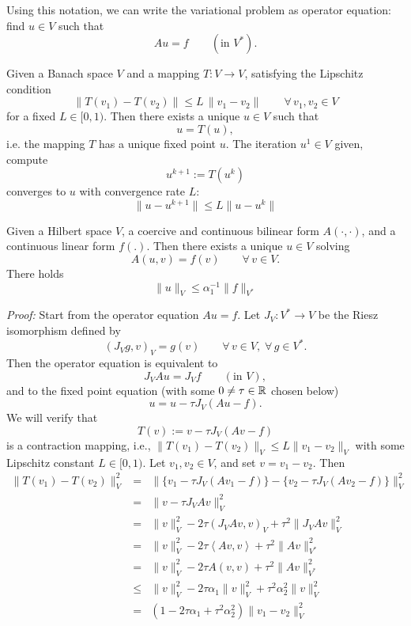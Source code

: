 Using this notation, we can write the variational problem as operator equation: find $u \in V$ such that
$$
A u = f \qquad (\mbox{in } V^\ast).
$$

\begin{theorem} Given a Banach space
$V$ and a mapping $T : V \rightarrow V$, satisfying the Lipschitz condition
$$
\| T(v_1) - T(v_2) \| \leq L \, \| v_1 - v_2 \| \qquad \forall  \, v_1, v_2 \in V
$$
for a fixed $L \in [0,1)$. Then there exists a unique $u \in V$ such that
$$
u = T(u),
$$
i.e. the mapping $T$ has a unique fixed point $u$. The iteration $u^1 \in V$ given, compute
$$
u^{k+1} := T(u^k)
$$
converges to $u$ with convergence rate $L$:
$$
\| u - u^{k+1} \| \leq L \| u - u^k \|
$$
\end{theorem}


\begin{theorem} Given a Hilbert space $V$, a coercive and continuous bilinear form $A(\cdot,\cdot)$, and a continuous linear form $f(.)$. Then there exists a unique $u \in V$ solving
$$
A(u,v) = f(v) \qquad \forall \, v \in V.
$$
There holds 
\begin{equation} \label{equ_lax_milgram_bound}
\| u \|_V \leq \alpha_1^{-1} \| f \|_{V^\ast}
\end{equation}
\end{theorem}
{\em Proof:} Start from the operator equation $A u = f$. Let $J_V : V^\ast \rightarrow V$ be the Riesz isomorphism defined by
$$
(J_V g, v)_V = g(v) \qquad \forall \, v \in V, \;  \forall \, g \in V^\ast.
$$
Then the operator equation is equivalent to
$$
J_V A u = J_V f \qquad (\mbox{in } V),
$$
and to the fixed point equation (with some $0 \neq \tau \in {\mathbb R}$ chosen below)
\begin{equation} \label{equ_fixedpointequ}
u = u - \tau J_V (A u - f).
\end{equation}
We will verify that
$$
T (v) := v - \tau J_V (A v - f)
$$
is a contraction mapping, i.e., $\| T (v_1) - T (v_2) \|_V \leq L \| v_1 - v_2 \|_V$ 
with some Lipschitz constant $L \in [0,1)$.
Let $v_1, v_2 \in V$, and set $v = v_1 - v_2$. Then
\begin{eqnarray*}
\| T (v_1) - T (v_2) \|_V^2 
& = & \| \{ v_1 - \tau J_V (A v_1 - f) \} - \{ v_2 - \tau J_V (A v_2 -f) \} \|_V^2 \\
& = & \| v - \tau J_V A v \|_V^2 \\
& = & \| v \|_V^2 - 2 \tau (J_V A v, v)_V + \tau^2 \| J_V A v \|_V^2 \\
& = & \| v \|_V^2 - 2 \tau \left< A v , v \right> + \tau^2 \| A v \|_{V^\ast}^2 \\
& = & \| v \|_V^2 - 2 \tau A(v,v) + \tau^2 \| A v \|_{V^\ast}^2 \\
& \leq & \| v \|_V^2 - 2 \tau \alpha_1 \| v \|_V^2 + \tau^2 \alpha_2^2 \| v \|_V^2 \\
& = & (1 - 2 \tau \alpha_1 + \tau^2 \alpha_2^2) \| v_1 - v_2 \|_V^2
\end{eqnarray*}

